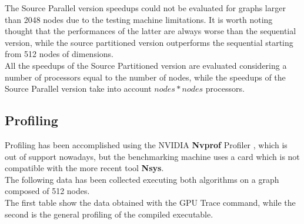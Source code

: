 \documentclass[
	a4paper, %
	12pt, %
]{class}
\begin{document}
The Source Parallel version speedups could not be evaluated for graphs larger than 2048 nodes due to the testing machine
limitations. It is worth noting thought that the performances of the latter are always worse than the sequential version, while the source
partitioned version outperforms the sequential starting from 512 nodes of dimensions. \\

All the speedups of the Source Partitioned version are evaluated considering a number of processors equal to the number of nodes, while the speedups
of the Source Parallel version take into account $nodes * nodes$ processors.

\subsection{Profiling}

Profiling has been accomplished using the NVIDIA \textbf{Nvprof} Profiler \cite{nvprof}, which is out of support nowadays, but the benchmarking machine uses a card which is not compatible
with the more recent tool \textbf{Nsys}. \cite{nsys} \\
The following data has been collected executing both algorithms on a graph composed of 512 nodes. \\

The first table show the data obtained with the GPU Trace command, while the second is the general profiling of the compiled executable. \\
\end{document}
